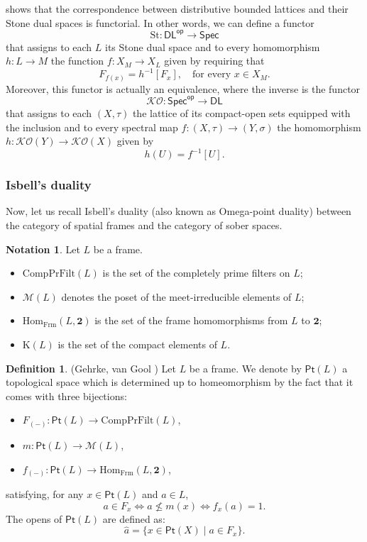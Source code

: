 \documentclass{article}
\theoremstyle{plain}
\theoremstyle{definition}
\newtheorem{definition}[theorem]{Definition}
\newtheorem{notation}[theorem]{Notation}
\theoremstyle{remark}
\newcommand{\bool}[1]{\mathsf{#1}}
\newcommand{\0}{\mathbbm 0}
\newcommand{\1}{\mathbbm 1}
\newcommand{\2}{\mathbbm 2}
\begin{document}
\cite[Thm. 6.4, Thm. 5.38]{gehrke2024topological} shows that the correspondence between distributive bounded lattices and their Stone
dual spaces is functorial. In other words, we can define a functor
\[\mathrm{St}: \bool{DL}^{\bool{op}} \to \bool{Spec}\] that assigns to each $L$ its Stone dual space and to every 
homomorphism $h: L \to M$  the function $f: X_M \to X_L$ given by
requiring that
\[
F_{f(x)} = h^{-1}[F_x], \quad \text{for every } x \in X_M.
\]
Moreover, this functor is actually an equivalence, where the inverse is the functor
\[\mathcal{KO}: \bool{Spec}^{\bool{op}} \to \bool{DL}\] that assigns to each $(X,\tau)$ the lattice of its compact-open sets equipped with the inclusion and to every 
spectral map $f: (X,\tau) \to (Y,\sigma)$  the homomorphism $h: \mathcal{KO}(Y) \to \mathcal{KO}(X)$ given by \[
h(U)=f^{-1}[U].
\]


\subsubsection{Isbell's duality}



Now, let us recall Isbell's duality (also known as Omega-point duality) between the category of spatial frames and the category of sober spaces.


\begin{notation}
\label{not:pt(L)}
Let \(L\) be a frame. 
\begin{itemize}
   \item $\mathrm{CompPrFilt}(L)$ is the set of the completely prime filters on $L$;
   \item $\mathcal{M}(L)$ denotes the poset of the meet-irreducible elements of $L$; 
   \item $\mathrm{Hom_{Frm}}(L, \textbf{2})$ is the set of the frame homomorphisms from $L$ to $\textbf{2}$; 
   \item $\mathrm{K}(L)$ is the set of the compact elements of $L$.
   
\end{itemize}
\end{notation}

\begin{definition}(Gehrke, van Gool \cite[Def 6.12]{gehrke2024topological}) \label{def:isbellpoint}
       Let $L$ be a frame. We denote by $\bool{Pt}(L)$ a topological space which is determined up to homeomorphism by the fact that it comes with three bijections:
\begin{itemize}
    \item $F_{(-)}: \bool{Pt}(L) \to \mathrm{CompPrFilt}(L)$,
    \item $m: \bool{Pt}(L) \to \mathcal{M}(L)$,
    \item $f_{(-)}: \bool{Pt}(L) \to \mathrm{Hom_ {Frm}}(L,  \textbf{2})$,
\end{itemize}
satisfying, for any $x \in \bool{Pt}(L)$ and $a \in L$,
\[
a \in F_x \iff a \not \leq m(x) \iff f_x(a) = 1.
\]
The opens of $\bool{Pt}(L)$ are defined as:
\[
\hat{a} = \{ x \in \bool{Pt}(X) \mid a \in F_x \}.
\]
\end{definition}
\end{document}
